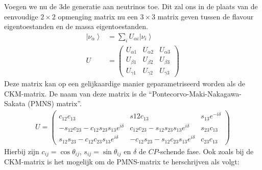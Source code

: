\documentclass[../main.tex]{subfiles}
\begin{document}
Voegen we nu de 3de generatie aan neutrinos toe. Dit zal ons in de plaats van de eenvoudige $2\times 2$ opmenging matrix nu een $3\times 3$ matrix geven tussen de flavour eigentoestanden en de massa eigentoestanden.
\begin{equation}
    \begin{aligned}
        \label{eq:neutrino_3_oscilaties_1}
\left|\nu_{\alpha}\right> &=\sum_{i} U_{\alpha i}\left|\nu_{i}\right> \\
        U &=\left(\begin{array}{lll}
                U_{\alpha 1} & U_{\alpha 2} & U_{\alpha 3} \\
                U_{\beta 1} & U_{\beta 2} & U_{\beta 3} \\
                U_{\gamma 1} & U_{\gamma 2} & U_{\gamma 3}
        \end{array}\right)
    \end{aligned}
\end{equation}
Deze matrix kan op een gelijkaardige manier geparametriseerd worden als de CKM-matrix. De naam van deze matrix is de ``Pontecorvo-Maki-Nakagawa-Sakata (PMNS) matrix''.
\begin{equation}
    \begin{aligned}
        \label{eq:pmns_matrix}
        U=\left(\begin{array}{ccc}
                c_{12} c_{13} & s{12} c_{13} & s_{13} e^{-i \delta} \\
                -s_{12} c_{23}-c_{12} s_{23} s_{13} e^{i \delta} & c_{12} c_{23}-s_{12} s_{23} s_{13} e^{i \delta} & s_{23} c_{13} \\
                s_{12} s_{23}-c_{12} c_{23} s_{13} e^{i \delta} & -c_{12} s_{23}-s_{12} c_{23} s_{13} e^{i \delta} & c_{23} c_{13}
        \end{array}\right)
    \end{aligned}
\end{equation}
Hierbij zijn $c_{i j}=\cos \theta_{i j}$, $s_{i j}=\sin \theta_{i j}$ en $\delta$ de $CP$-schende fase. Ook zoals bij de CKM-matrix is het mogelijk om de PMNS-matrix te herschrijven als volgt:
\end{document}
